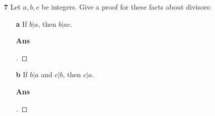 \documentclass[paper=usletter, fontsize=12pt]{article}
\begin{document}
\begin{itemize}
\begin{itemize}




                \item[\textbf{7}] Let $a, b, c$ be integers. Give a proof for
                these facts about divisors:

                \begin{itemize}

                    \item[\textbf{a}] If $b | a$, then $b | ac$.
                    \item[\textbf{Ans}]
                    \begin{proof}[\unskip\nopunct]
                    \end{proof}
                    \vspace{0.2in}

                    \item[\textbf{b}] If $b | a$ and $c | b$, then $c | a$.
                    \item[\textbf{Ans}]
                    \begin{proof}[\unskip\nopunct]
                    \end{proof}
                    \vspace{0.2in}


\end{itemize}
\end{itemize}
\end{itemize}
\end{document}
